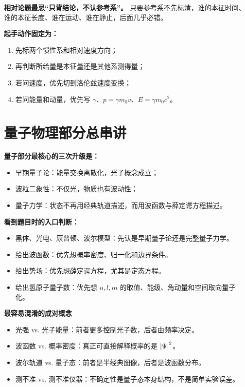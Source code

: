 \documentclass[lang=cn,11pt]{elegantbook}
\begin{document}
\begin{note}
\textbf{相对论题最忌“只背结论，不认参考系”。} 只要参考系不先标清，谁的本征时间、谁的本征长度、谁在运动、谁在静止，后面几乎必错。
\end{note}

\textbf{起手动作固定为：}
\begin{enumerate}
  \item 先标两个惯性系和相对速度方向；
  \item 再判断所给量是本征量还是其他系测得量；
  \item 若问速度，优先切到洛伦兹速度变换；
  \item 若问能量和动量，优先写 \(\gamma\)、\(p=\gamma m_0v\)、\(E=\gamma m_0c^2\)。
\end{enumerate}

\section{量子物理部分总串讲}

\textbf{量子部分最核心的三次升级是：}
\begin{itemize}
  \item 早期量子论：能量交换离散化，光子概念成立；
  \item 波粒二象性：不仅光，物质也有波动性；
  \item 量子力学：状态不再用经典轨道描述，而用波函数与薛定谔方程描述。
\end{itemize}

\textbf{看到题目时的入口判断：}
\begin{itemize}
  \item 黑体、光电、康普顿、波尔模型：先认是早期量子论还是完整量子力学。
  \item 给出波函数：优先想概率密度、归一化和边界条件。
  \item 给出势场：优先想薛定谔方程，尤其是定态方程。
  \item 给出氢原子量子数：优先想 \(n,l,m\) 的取值、能级、角动量和空间取向量子化。
\end{itemize}

\textbf{最容易混淆的成对概念}
\begin{itemize}
  \item 光强 vs. 光子能量：前者更多控制光子数，后者由频率决定。
  \item 波函数 vs. 概率密度：真正可直接解释概率的是 \(\abs{\Psi}^2\)。
  \item 波尔轨道 vs. 量子态：前者是半经典图像，后者是波函数分布。
  \item 测不准 vs. 测不准仪器：不确定性是量子态本身结构，不是简单实验误差。
\end{itemize}
\end{document}
